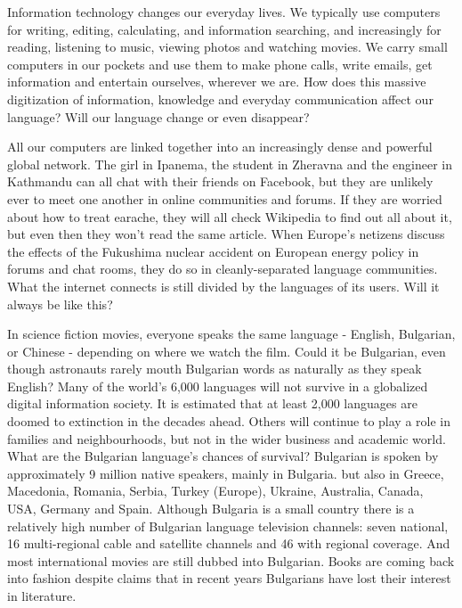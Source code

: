 \begin{multicols}{2}
Information technology changes our everyday lives. We typically use computers for writing, editing, calculating, and information searching, and increasingly for reading, listening to music, viewing photos and watching movies. We carry small computers in our pockets and use them to make phone calls, write emails, get information and entertain ourselves, wherever we are. How does this massive digitization of information, knowledge and everyday communication affect our language? Will our language change or even disappear?

All our computers are linked together into an increasingly dense and powerful global network. The girl in Ipanema, the student in Zheravna and the engineer in Kathmandu can all chat with their friends on Facebook, but they are unlikely ever to meet one another in online communities and forums. If they are worried about how to treat earache, they will all check Wikipedia to find out all about it, but even then they won’t read the same article. When Europe's netizens discuss the effects of the Fukushima nuclear accident on European energy policy in forums and chat rooms, they do so in cleanly-separated language communities. What the internet connects is still divided by the languages of its users. Will it always be like this? 

In science fiction movies, everyone speaks the same language - English, Bulgarian, or Chinese - depending on where we watch the film. Could it be Bulgarian, even though astronauts rarely mouth Bulgarian words as naturally as they speak English? Many of the world’s 6,000 languages will not survive in a globalized digital information society. It is estimated that at least 2,000 languages are doomed to extinction in the decades ahead. Others will continue to play a role in families and neighbourhoods, but not in the wider business and academic world. What are the Bulgarian language’s chances of survival? 
Bulgarian is spoken by approximately 9 million native speakers, mainly in Bulgaria. but also in Greece, Macedonia, Romania, Serbia, Turkey (Europe), Ukraine, Australia, Canada, USA, Germany and Spain. Although Bulgaria is a small country there is a relatively high number of Bulgarian language television channels: seven national, 16 multi-regional cable and satellite channels and 46 with regional coverage. And most international movies are still dubbed into Bulgarian. Books are coming back into fashion despite claims that in recent years Bulgarians have lost their interest in literature.


\end{multicols}
